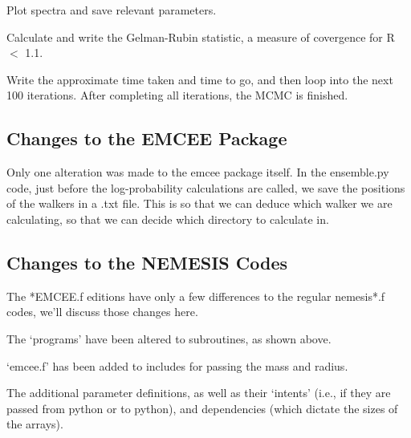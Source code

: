 \documentclass[11pt, a4paper,titlepage]{report}
\begin{document}
Plot spectra and save relevant parameters.



Calculate and write the Gelman-Rubin statistic, a measure of covergence for R $<$ 1.1. 



Write the approximate time taken and time to go, and then loop into the next 100 iterations. After completing all iterations, the MCMC is finished.

\subsection{Changes to the EMCEE Package}



Only one alteration was made to the emcee package itself. In the ensemble.py code, just before the log-probability calculations are called, we save the positions of the walkers in a .txt file. This is so that we can deduce which walker we are calculating, so that we can decide which directory to calculate in.


\subsection{Changes to the NEMESIS Codes}

The *EMCEE.f editions have only a few differences to the regular nemesis*.f codes, we'll discuss those changes here.



The `programs' have been altered to subroutines, as shown above.



`emcee.f' has been added to includes for passing the mass and radius. 



The additional parameter definitions, as well as their `intents' (i.e., if they are passed from python or to python), and dependencies (which dictate the sizes of the arrays). 
\end{document}
